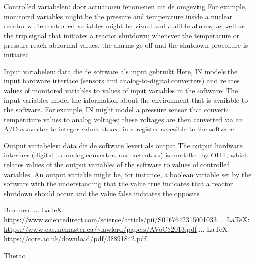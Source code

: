 \begin{thebibliography}{99}
{{{{Controlled variabelen: door actuatoren \bestuurde fenomenen uit de omgeving
For example, monitored variables might be the pressure and temperature
inside a nuclear reactor while controlled variables might be visual and audible alarms, as well
as the trip signal that initiates a reactor shutdown; whenever the temperature or pressure reach
abnormal values, the alarms go off and the shutdown procedure is initiated

Input variabelen: data die de software als input gebruikt
Here, IN models the input hardware interface (sensors and analog-to-digital converters) and
relates values of monitored variables to values of input variables in the software. The input variables model the information about the environment that is available to the software. For example,
IN might model a pressure sensor that converts temperature values to analog voltages; these voltages are then converted via an A/D converter to integer values stored in a register accesible to the
software.

Output variabelen: data die de software levert als output
The output hardware interface (digital-to-analog converters and actuators) is modelled
by OUT, which relates values of the output variables of the software to values of controlled variables. An output variable might be, for instance, a boolean variable set by the software with the
understanding that the value true indicates that a reactor shutdown should occur and the value
false indicates the opposite


Bronnen:
 ... \LaTeX:\\ \url{https://www.sciencedirect.com/science/article/pii/S0167642315001033}
 ... \LaTeX:\\ \url{https://www.cas.mcmaster.ca/~lawford/papers/AVoCS2013.pdf}
 ... \LaTeX:\\ \url{https://core.ac.uk/download/pdf/38891842.pdf}

Therac


}}}}
\end{thebibliography}
